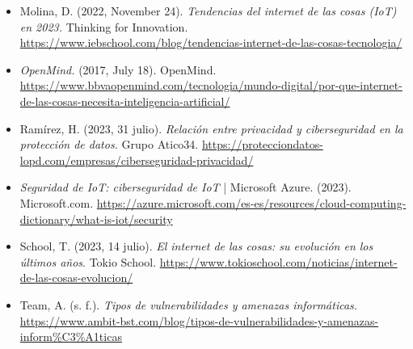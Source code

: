 \documentclass[12pt]{article}
\begin{document}
\begin{itemize}
    \item Molina, D. (2022, November 24). \textit{Tendencias del internet de las cosas (IoT) en 2023.} Thinking for Innovation. \url{https://www.iebschool.com/blog/tendencias-internet-de-las-cosas-tecnologia/}
    \item \textit{OpenMind.} (2017, July 18). OpenMind. \url{https://www.bbvaopenmind.com/tecnologia/mundo-digital/por-que-internet-de-las-cosas-necesita-inteligencia-artificial/} \\
    \item Ramírez, H. (2023, 31 julio). \textit{Relación entre privacidad y ciberseguridad en la protección de datos.} Grupo Atico34. \url{https://protecciondatos-lopd.com/empresas/ciberseguridad-privacidad/} \\
    \item \textit{Seguridad de IoT: ciberseguridad de IoT} | Microsoft Azure. (2023). Microsoft.com. \url{https://azure.microsoft.com/es-es/resources/cloud-computing-dictionary/what-is-iot/security} \\
    \item School, T. (2023, 14 julio). \textit{El internet de las cosas: su evolución en los últimos años}. Tokio School. \url{https://www.tokioschool.com/noticias/internet-de-las-cosas-evolucion/} \\
    \item Team, A. (s. f.). \textit{Tipos de vulnerabilidades y amenazas informáticas.} \url{https://www.ambit-bst.com/blog/tipos-de-vulnerabilidades-y-amenazas-inform%C3%A1ticas}
  \end{itemize}
\end{document}
